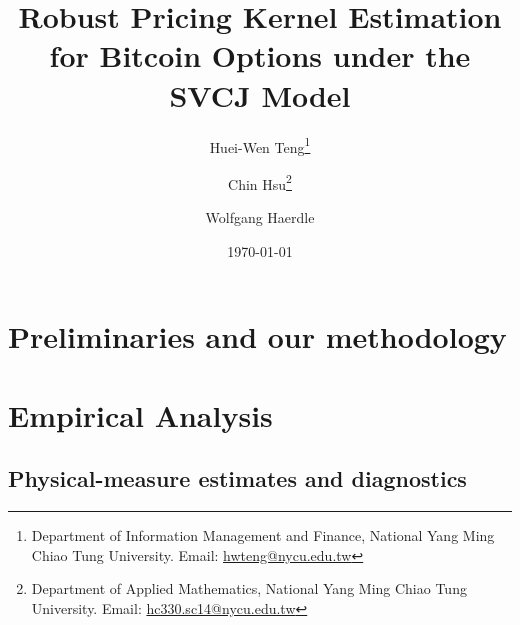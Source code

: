 \documentclass[11pt]{article}
\begin{document}
\begin{titlepage}
\title{Robust Pricing Kernel Estimation for Bitcoin Options under the SVCJ Model}%
\author{Huei-Wen Teng\thanks{Department of Information Management and Finance, National Yang Ming Chiao Tung University. Email: \href{mailto:hwteng@nycu.edu.tw}{hwteng@nycu.edu.tw}} \and Chin Hsu\thanks{Department of Applied Mathematics, National Yang Ming Chiao Tung University. Email: \href{mailto:hc330.sc14@nycu.edu.tw}{hc330.sc14@nycu.edu.tw}}  \and Wolfgang Haerdle}
\date{\today}
\maketitle


\setcounter{page}{0}
\thispagestyle{empty}
\end{titlepage}

\doublespacing












\section{Preliminaries and our methodology}\label{sec:preliminaries}




\section{Empirical Analysis} \label{sec:empirical_analysis}

\subsection{Physical-measure estimates and diagnostics}
\label{sec:p-estimation-results}
\end{document}
